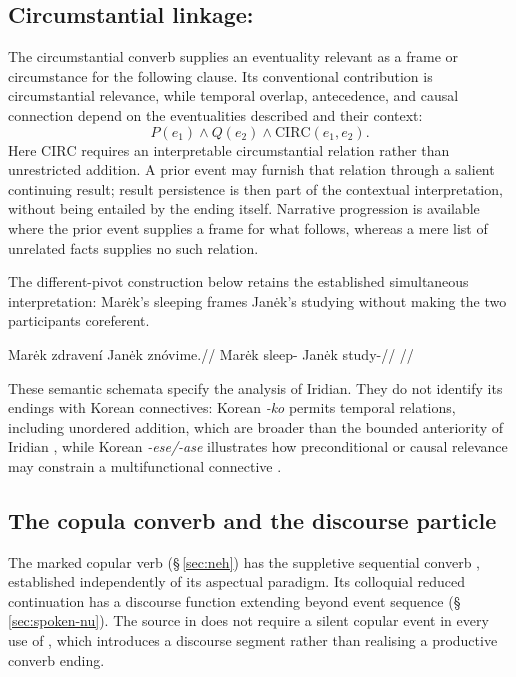 \subsection{Circumstantial linkage: }

The circumstantial converb  supplies an eventuality relevant as a
frame or circumstance for the following clause. Its conventional contribution
is circumstantial relevance, while temporal overlap, antecedence, and causal
connection depend on the eventualities described and their context:
\[
P(e_1)\land Q(e_2)\land \mathrm{CIRC}(e_1,e_2).
\]
Here $\mathrm{CIRC}$ requires an interpretable circumstantial relation rather
than unrestricted addition. A prior event may furnish that relation through a
salient continuing result; result persistence is then part of the contextual
interpretation, without being entailed by the ending itself. Narrative
progression is available where the prior event supplies a frame for what
follows, whereas a mere list of unrelated facts supplies no such relation.

The different-pivot construction below retains the established simultaneous
interpretation: Marėk's sleeping frames Janėk's studying without making the
two participants coreferent.

\ex\label{ex:circ-different-pivot}%
\begingl
\gla Marėk zdravení Janėk znóvime.//
\glb Marėk sleep-\Circ{} Janėk study-\Prog{}//
\glft {}//
\endgl
\xe

These semantic schemata specify the analysis of Iridian. They do not identify
its endings with Korean connectives: Korean \textit{-ko} permits temporal
relations, including unordered addition, which are broader than the bounded
anteriority of Iridian , while Korean \textit{-ese/-ase} illustrates
how preconditional or causal relevance may constrain a multifunctional
connective \cite[300--301]{sohn2009}.

\subsection{The copula converb and the discourse particle }\label{sec:seq-copula}

The marked copular verb  (§\,\ref{sec:neh}) has the suppletive
sequential converb , established independently of its aspectual
paradigm. Its colloquial reduced continuation  has a discourse function
extending beyond event sequence (§\,\ref{sec:spoken-nu}). The source in
 does not require a silent copular event in every use of ,
which introduces a discourse segment rather than realising a productive
converb ending.


